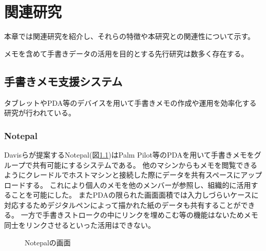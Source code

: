 \chapter{関連研究}
\label{chap:kanren}

本章では関連研究を紹介し、それらの特徴や本研究との関連性について示す。

\newpage

メモを含めて手書きデータの活用を目的とする先行研究は数多く存在する。


\section{手書きメモ支援システム}
タブレットやPDA等のデバイスを用いて手書きメモの作成や運用を効率化する研究が行われている。

\subsection{Notepal}
Davisらが提案するNotepal\cite{Davis1999NotePalsLN}(図\ref{notepal})はPalm Pilot等のPDAを用いて手書きメモをグループで共有可能にするシステムである。
他のマシンからもメモを閲覧できるようにクレードルでホストマシンと接続した際にデータを共有スペースにアップロードする。
これにより個人のメモを他のメンバーが参照し、組織的に活用することを可能にした。
またPDAの限られた画面面積では入力しづらいケースに対応するためデジタルペンによって描かれた紙のデータも共有することができる。
一方で手書きストロークの中にリンクを埋めこむ等の機能はないためメモ同士をリンクさせるといった活用はできない。

\begin{figure}[H]
    \centering
    \caption{Notepalの画面}
    \label{notepal}
\end{figure}

